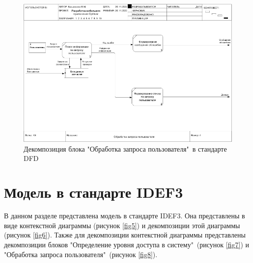 \documentclass[14pt]{extreport}
\begin{document}
\begin{landscape}
\begin{figure}[H]
\centerline{\includegraphics[width=0.9\linewidth]{04_A4}}
\caption{Декомпозиция блока "Обработка запроса пользователя"\ в стандарте DFD}
\label{fig4}
\end{figure}
\end{landscape}

\section{Модель в стандарте IDEF3}

В данном разделе представлена модель в стандарте IDEF3. Она представлены в виде контекстной диаграммы  (рисунок \ref{fig5}) и декомпозиции этой диаграммы  (рисунок \ref{fig6}). Также для декомпозиции контекстной диаграммы представлены декомпозиции блоков "Определение уровня доступа в систему"\ (рисунок \ref{fig7}) и "Обработка запроса пользователя"\ (рисунок \ref{fig8}).
\end{document}
